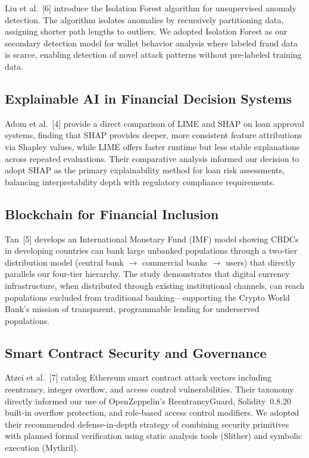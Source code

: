 \documentclass[12pt,a4paper]{report}
\begin{document}
Liu et al.~[6] introduce the Isolation Forest algorithm for unsupervised anomaly detection. The algorithm isolates anomalies by recursively partitioning data, assigning shorter path lengths to outliers. We adopted Isolation Forest as our secondary detection model for wallet behavior analysis where labeled fraud data is scarce, enabling detection of novel attack patterns without pre-labeled training data.

\subsection{Explainable AI in Financial Decision Systems}

Adom et al.~[4] provide a direct comparison of LIME and SHAP on loan approval systems, finding that SHAP provides deeper, more consistent feature attributions via Shapley values, while LIME offers faster runtime but less stable explanations across repeated evaluations. Their comparative analysis informed our decision to adopt SHAP as the primary explainability method for loan risk assessments, balancing interpretability depth with regulatory compliance requirements.

\subsection{Blockchain for Financial Inclusion}

Tan~[5] develops an International Monetary Fund (IMF) model showing CBDCs in developing countries can bank large unbanked populations through a two-tier distribution model (central bank $\to$ commercial banks $\to$ users) that directly parallels our four-tier hierarchy. The study demonstrates that digital currency infrastructure, when distributed through existing institutional channels, can reach populations excluded from traditional banking---supporting the Crypto World Bank's mission of transparent, programmable lending for underserved populations.

\subsection{Smart Contract Security and Governance}

Atzei et al.~[7] catalog Ethereum smart contract attack vectors including reentrancy, integer overflow, and access control vulnerabilities. Their taxonomy directly informed our use of OpenZeppelin's ReentrancyGuard, Solidity~0.8.20 built-in overflow protection, and role-based access control modifiers. We adopted their recommended defense-in-depth strategy of combining security primitives with planned formal verification using static analysis tools (Slither) and symbolic execution (Mythril).
\end{document}
